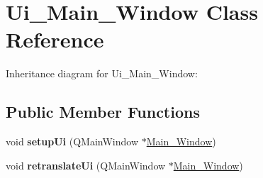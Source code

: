 \hypertarget{class_ui___main___window}{}\section{Ui\+\_\+\+Main\+\_\+\+Window Class Reference}
\label{class_ui___main___window}


Inheritance diagram for Ui\+\_\+\+Main\+\_\+\+Window\+:
\subsection*{Public Member Functions}
\begin{DoxyCompactItemize}
\item 
\mbox{\label{class_ui___main___window_a88f03e3f67bcffb12641407cd9b395e2}} 
void {\bfseries setup\+Ui} (Q\+Main\+Window $\ast$\hyperlink{class_main___window}{Main\+\_\+\+Window})
\item 
\mbox{\label{class_ui___main___window_a0eac62ef94dc88556004bfc0cf2cab15}} 
void {\bfseries retranslate\+Ui} (Q\+Main\+Window $\ast$\hyperlink{class_main___window}{Main\+\_\+\+Window})
\end{DoxyCompactItemize}
